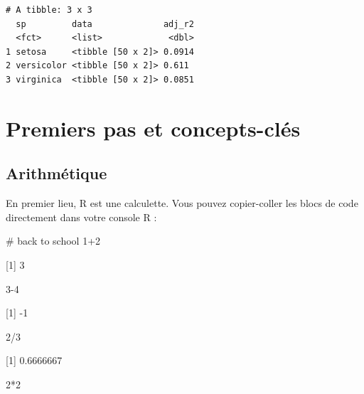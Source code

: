 \documentclass[
  letterpaper,
  DIV=11,
  numbers=noendperiod]{scrreprt}
\newenvironment{Shaded}{\begin{snugshade}}{\end{snugshade}}
\newcommand{\CommentTok}[1]{\textcolor[rgb]{0.37,0.37,0.37}{#1}}
\newcommand{\DecValTok}[1]{\textcolor[rgb]{0.68,0.00,0.00}{#1}}
\newcommand{\SpecialCharTok}[1]{\textcolor[rgb]{0.37,0.37,0.37}{#1}}
\begin{document}
\begin{verbatim}
# A tibble: 3 x 3
  sp         data              adj_r2
  <fct>      <list>             <dbl>
1 setosa     <tibble [50 x 2]> 0.0914
2 versicolor <tibble [50 x 2]> 0.611 
3 virginica  <tibble [50 x 2]> 0.0851
\end{verbatim}


\hypertarget{premiers-pas-et-concepts-cluxe9s}{%
\chapter{Premiers pas et
concepts-clés}\label{premiers-pas-et-concepts-cluxe9s}}

\hypertarget{arithmuxe9tique}{%
\section{Arithmétique}\label{arithmuxe9tique}}

En premier lieu, R est une calculette. Vous pouvez copier-coller les
blocs de code directement dans votre console R :

\begin{Shaded}
\begin{Highlighting}[]
\CommentTok{\# back to school}
\DecValTok{1}\SpecialCharTok{+}\DecValTok{2}
\end{Highlighting}
\end{Shaded}

{[}1{]} 3

\begin{Shaded}
\begin{Highlighting}[]
\DecValTok{3{-}4}
\end{Highlighting}
\end{Shaded}

{[}1{]} -1

\begin{Shaded}
\begin{Highlighting}[]
\DecValTok{2}\SpecialCharTok{/}\DecValTok{3}
\end{Highlighting}
\end{Shaded}

{[}1{]} 0.6666667

\begin{Shaded}
\begin{Highlighting}[]
\DecValTok{2}\SpecialCharTok{*}\DecValTok{2}
\end{Highlighting}
\end{Shaded}
\end{document}
